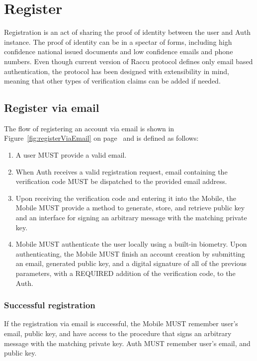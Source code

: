 \section{Register}
Registration is an act of sharing the proof of identity between the user and Auth instance. The proof of identity
can be in a spectar of forms, including high confidence national issued documents and low confidence emails and 
phone numbers. Even though current version of Raccu protocol defines only email based authentication, the protocol
has been designed with extensibility in mind, meaning that other types of verification claims can be added if
needed.

      \subsection{Register via email}
      The flow of registering an account via email is shown in Figure~\ref{fig:registerViaEmail} on 
      page~\pageref{fig:registerViaEmail} and is defined as follows:
      \begin{enumerate}
            \item A user MUST provide a valid email.
            \item When Auth receives a valid registration request, email containing the verification code MUST 
                  be dispatched to the provided email address.
            \item Upon receiving the verification code and entering it into the Mobile, the Mobile MUST provide 
                  a method to generate, store, and retrieve public key and an interface for signing an arbitrary 
                  message with the matching private key.
            \item Mobile MUST authenticate the user locally using a built-in biometry. Upon authenticating, 
                  the Mobile MUST finish an account creation by submitting an email, generated public key, 
                  and a digital signature of all of the previous parameters, with a REQUIRED addition of the 
                  verification code, to the Auth.
      \end{enumerate}
                 
      
            \subsubsection{Successful registration}
            If the registration via email is successful, the Mobile MUST remember user's email, public key, and 
            have access to the procedure that signs an arbitrary message with the matching private key. Auth MUST 
            remember user's email, and public key.


